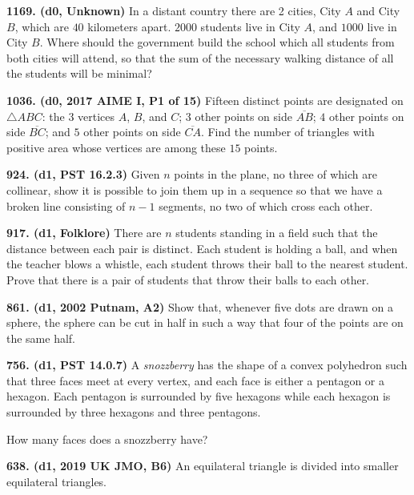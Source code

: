 \documentclass{article}
\begin{document}
\textbf{1169. (\color{red}d0\color{black}, Unknown)} In a distant country there are 2 cities, City $A$ and City $B$, which are $40$ kilometers apart.  $2000$ students live in City $A$, and $1000$ live in City $B$. Where should the government build the school which all students from both cities will attend, so that the sum of the necessary walking distance of all the students will be minimal?

\textbf{1036. (\color{red}d0\color{black}, 2017 AIME I, P1 of 15)} Fifteen distinct points are designated on $\triangle ABC$: the 3 vertices $A$, $B$, and $C$; $3$ other points on side $\overline{AB}$; $4$ other points on side $\overline{BC}$; and $5$ other points on side $\overline{CA}$. Find the number of triangles with positive area whose vertices are among these $15$ points.

\textbf{924. (\color{red}d1\color{black}, PST 16.2.3)} Given \(n\) points in the plane, no three of which are collinear, show it is possible to join them up
in a sequence so that we have a broken line consisting of \(n-1\) segments, no two of which cross
each other.

\textbf{917. (\color{red}d1\color{black}, Folklore)} There are \(n\) students standing in a field such that the distance between each pair is distinct. Each student is holding a ball, and when the teacher blows a whistle, each student throws their ball to the nearest student. Prove that there is a pair of students that throw their balls to each other.

\textbf{861. (\color{red}d1\color{black}, 2002 Putnam, A2)} Show that, whenever five dots are drawn on a sphere, the sphere can be cut in half in such a way that four of the points are on the same half.

\textbf{756. (\color{red}d1\color{black}, PST 14.0.7)} A \emph{snozzberry} has the shape of a convex polyhedron such that three faces meet at every vertex, and each face is either a pentagon or a hexagon. Each pentagon is surrounded by five hexagons while each hexagon is surrounded by three hexagons and three pentagons.

\vspace{0.75em}

How many faces does a snozzberry have?

\textbf{638. (\color{red}d1\color{black}, 2019 UK JMO, B6)} An equilateral triangle is divided into smaller equilateral triangles.

\begin{center}
\end{center}
\end{document}
